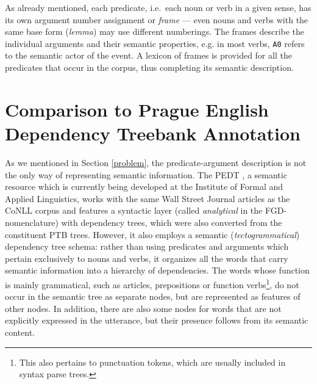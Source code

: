 \documentclass[12pt,notitlepage]{report}
\begin{document}
As already mentioned, each predicate, i.e.\ each noun or verb in a given sense, has its own argument number assignment or \emph{frame} --- even nouns and verbs with the same base form (\emph{lemma}) may use different numberings. The frames describe the individual arguments and their semantic properties, e.g. in most verbs, \texttt{A0} refers to the semantic actor of the event. A lexicon of frames is provided for all the predicates that occur in the corpus, thus completing its semantic description.

\section{Comparison to Prague English Dependency Treebank Annotation}\label{pedt}

As we mentioned in Section \ref{problem}, the predicate-argument description is not the only way of representing semantic information. The PEDT \citep{cinkova09}, a semantic resource which is currently being developed at the Institute of Formal and Applied Linguistics, works with the same Wall Street Journal articles as the CoNLL corpus and features a syntactic layer (called \emph{analytical} in the FGD-nomenclature) with dependency trees, which were also converted from the constituent PTB trees. However, it also employs a semantic (\emph{tectogrammatical}) dependency tree schema: rather than using predicates and arguments which pertain exclusively to nouns and verbs, it organizes all the words that carry semantic information into a hierarchy of dependencies. The words whose function is mainly grammatical, such as articles, prepositions or function verbs\footnote{This also pertains to punctuation tokens, which are usually included in syntax parse trees.}, do not occur in the semantic tree as separate nodes, but are represented as features of other nodes. In addition, there are also some nodes for words that are not explicitly expressed in the utterance, but their presence follows from its semantic content. 
\end{document}
